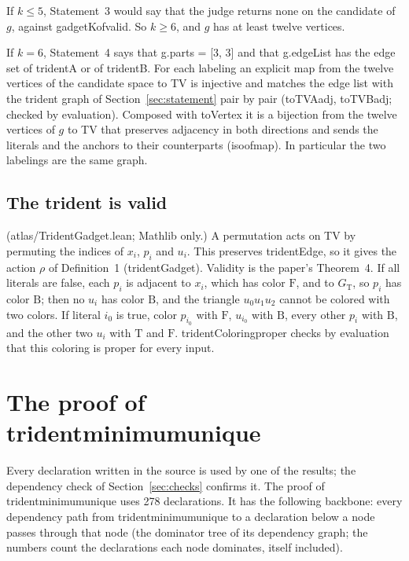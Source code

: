 \documentclass[11pt,a4paper]{article}
\newcommand{\leanus}{\textunderscore\allowbreak}
\newcommand{\lean}[1]{{\ttfamily\let\_\leanus #1}}
\newcommand{\GT}{G_{\mathrm{T}}}
\newcommand{\T}{\mathrm{T}}
\newcommand{\F}{\mathrm{F}}
\newcommand{\B}{\mathrm{B}}
\theoremstyle{definition}
\begin{document}
If $k\le5$, Statement~3 would say that the judge returns \lean{none} on the
candidate of $g$, against \lean{gadgetK\_of\_valid}. So $k\ge6$, and $g$ has
at least twelve vertices.

If $k=6$, Statement~4 says that
\lean{g.parts = [3, 3]} and that \lean{g.edgeList} has the edge set of
\lean{tridentA} or of \lean{tridentB}. For each labeling an explicit map from
the twelve vertices of the candidate space to \lean{TV} is injective and
matches the edge list with the trident graph of Section~\ref{sec:statement}
pair by pair (\lean{toTVA\_adj}, \lean{toTVB\_adj}; checked by evaluation).
Composed with \lean{toVertex} it is a bijection from the twelve vertices of
$g$ to \lean{TV} that preserves adjacency in both directions and sends the literals
and the anchors to their counterparts (\lean{iso\_of\_map}). In particular
the two labelings are the same graph.

\subsection{The trident is valid}\label{sec:tridentvalid}
(\lean{atlas/TridentGadget.lean}; Mathlib only.) A permutation acts on
\lean{TV} by permuting the indices of $x_i$, $p_i$ and $u_i$. This preserves
\lean{tridentEdge}, so it gives the action $\rho$ of Definition~1
(\lean{tridentGadget}). Validity is the paper's Theorem~4. If all literals
are false, each $p_i$ is adjacent to $x_i$, which has color $\F$, and to
$\GT$, so $p_i$ has color $\B$; then no $u_i$ has color $\B$, and the
triangle $u_0u_1u_2$ cannot be colored with two colors. If literal $i_0$ is
true, color $p_{i_0}$ with $\F$, $u_{i_0}$ with $\B$, every other $p_i$ with
$\B$, and the other two $u_i$ with $\T$ and $\F$.
\lean{tridentColoring\_proper} checks by evaluation that this coloring is
proper for every input.

\section{The proof of \lean{trident\_minimum\_unique}}\label{sec:proof}

Every declaration written in the source is used by one of the results; the
dependency check of Section~\ref{sec:checks} confirms it.
The proof of \lean{trident\_minimum\_unique} uses 278 declarations. It has
the following backbone: every dependency path from
\lean{trident\_minimum\_unique} to a declaration below a node passes through
that node (the dominator tree of its dependency graph; the numbers count the
declarations each node dominates, itself included).
\end{document}
